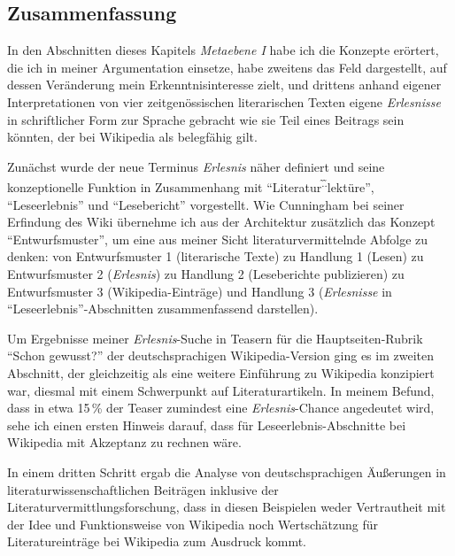 \documentclass[fontsize=12pt]{scrartcl}
\begin{document}
\pagebreak

\subsection{Zusammenfassung}
\label{subsubsec:5.5}

In den Abschnitten dieses Kapitels \textit{Metaebene I} habe ich die Konzepte er\"ortert, die ich in meiner Argumentation einsetze, habe zwei\-tens das Feld dargestellt, auf dessen Ver\"anderung mein Erkenntnisinteresse zielt, und drittens anhand eigener Interpretationen von \mbox{vier} zeitgen\"ossischen li\-te\-ra\-rischen Texten eigene \textit{Erlesnisse} in schriftlicher Form zur Sprache gebracht wie sie Teil eines Beitrags sein k\"onnten, der bei Wi\-ki\-pe\-dia als belegf\"ahig gilt. 

Zun\"achst wurde der neue Terminus \textit{Erlesnis} n\"aher definiert und seine kon\-zep\-tio\-nel\-le Funk\-tion in Zusammenhang mit "`Li\-te\-ra\-tur\textsuperscript{\~.\~.}lekt\"ure"', "`Leseerlebnis"' und "`Lesebericht"' vorgestellt. Wie Cunningham bei seiner Erfindung des Wiki \"ubernehme ich aus der Architektur zus\"atzlich das Konzept "`Entwurfsmuster"', um eine aus meiner Sicht li\-te\-ra\-tur\-vermittelnde Abfolge zu denken: von Entwurfsmuster 1 (li\-te\-ra\-rische Texte) zu Handlung 1 (Lesen) zu Entwurfsmuster 2 (\textit{Erlesnis}) zu Handlung 2 (Leseberichte pu\-bli\-zieren) zu Entwurfsmuster 3 (Wi\-ki\-pe\-dia-Eintr\"age) und Handlung 3 (\textit{Erlesnisse} in "`Leseerlebnis"'-Abschnitten zusammenfassend dar\-stel\-len).

Um Ergebnisse meiner \textit{Erlesnis}-Suche in Teasern f\"ur die Hauptsei\-ten-Rubrik "`Schon gewusst?"' der deutschspra\-chi\-gen Wi\-ki\-pe\-dia-Version ging es im zwei\-ten Abschnitt, der gleichzeitig als eine weitere Einf\"uh\-rung zu Wi\-ki\-pe\-dia konzipiert war, diesmal mit einem Schwerpunkt auf Li\-te\-ra\-tur\-artikeln. In meinem Befund, dass in etwa 15\,\% der Teaser zumindest eine \textit{Erlesnis}-Chance angedeutet wird, sehe ich einen ersten Hinweis darauf, dass f\"ur Leseerlebnis-Abschnitte bei Wi\-ki\-pe\-dia mit Akzeptanz zu rechnen w\"are.

In einem dritten Schritt ergab die Ana\-lyse von deutschspra\-chi\-gen \"Au{\ss}erungen in li\-te\-ra\-tur\-wissenschaftlichen Beitr\"agen inklusive der Li\-te\-ra\-tur\-ver\-mitt\-lungsfor\-schung, dass in diesen Beispielen weder Vertrautheit mit der Idee und Funktionsweise von Wi\-ki\-pe\-dia noch Wertsch\"atzung f\"ur Li\-te\-ra\-tur\-eintr\"age bei Wi\-ki\-pe\-dia zum Ausdruck kommt.
\end{document}
